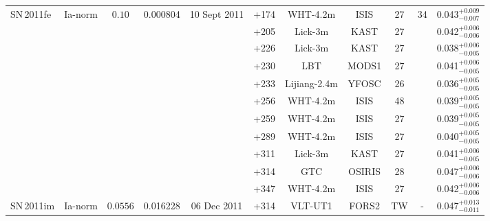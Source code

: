 \documentclass[fleqn,usenatbib]{mnras}
\begin{document}
\begin{table}
{\begin{tabular}{l c c c c c c c c c c}
    SN\,2011fe & Ia-norm   & $0.10$    & 0.000804 & 10 Sept 2011 & +174   & WHT-4.2m & ISIS          & 27& 34 & 0.043$^{+0.009}_{-0.007}$ \\
             &           &           &          &              & +205   & Lick-3m  & KAST          & 27&    & 0.042$^{+0.006}_{-0.006}$ \\
             &           &           &          &              & +226   & Lick-3m  & KAST          & 27&    & 0.038$^{+0.006}_{-0.005}$ \\
             &           &           &          &              & +230   & LBT      & MODS1         & 27&    & 0.041$^{+0.006}_{-0.005}$ \\
             &           &           &          &              & +233   & Lijiang-2.4m & YFOSC     & 26&    & 0.036$^{+0.005}_{-0.005}$ \\
             &           &           &          &              & +256   & WHT-4.2m & ISIS          & 48&    & 0.039$^{+0.005}_{-0.005}$ \\
             &           &           &          &              & +259   & WHT-4.2m & ISIS          & 27&    & 0.039$^{+0.005}_{-0.005}$ \\
             &           &           &          &              & +289   & WHT-4.2m & ISIS          & 27&    & 0.040$^{+0.005}_{-0.005}$ \\
             &           &           &          &              & +311   & Lick-3m  & KAST          & 27&    & 0.041$^{+0.006}_{-0.005}$ \\
             &           &           &          &              & +314   & GTC      & OSIRIS        & 28&    & 0.047$^{+0.006}_{-0.006}$ \\
             &           &           &          &              & +347   & WHT-4.2m & ISIS          & 27&    & 0.042$^{+0.006}_{-0.006}$ \\
    SN\,2011im & Ia-norm   & $0.0556$  & 0.016228 & 06 Dec 2011  & +314   & VLT-UT1  & FORS2         & TW& -  & 0.047$^{+0.013}_{-0.011}$ \\

\end{tabular}}
\end{table}
\end{document}
